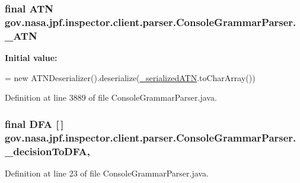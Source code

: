 \subsubsection[{\texorpdfstring{\+\_\+\+A\+TN}{_ATN}}]{\setlength{\rightskip}{0pt plus 5cm}final A\+TN gov.\+nasa.\+jpf.\+inspector.\+client.\+parser.\+Console\+Grammar\+Parser.\+\_\+\+A\+TN\hspace{0.3cm}{\ttfamily [static]}}\hypertarget{classgov_1_1nasa_1_1jpf_1_1inspector_1_1client_1_1parser_1_1_console_grammar_parser_a46eeaa0d1f85061ae721d15d137c2336}{}\label{classgov_1_1nasa_1_1jpf_1_1inspector_1_1client_1_1parser_1_1_console_grammar_parser_a46eeaa0d1f85061ae721d15d137c2336}
{\bfseries Initial value\+:}
\begin{DoxyCode}
=
    \textcolor{keyword}{new} ATNDeserializer().deserialize(\hyperlink{classgov_1_1nasa_1_1jpf_1_1inspector_1_1client_1_1parser_1_1_console_grammar_parser_a2ce69e50a570df550617bcd512552f98}{\_serializedATN}.toCharArray())
\end{DoxyCode}


Definition at line 3889 of file Console\+Grammar\+Parser.\+java.

\subsubsection[{\texorpdfstring{\+\_\+decision\+To\+D\+FA}{_decisionToDFA}}]{\setlength{\rightskip}{0pt plus 5cm}final D\+FA \mbox{[}$\,$\mbox{]} gov.\+nasa.\+jpf.\+inspector.\+client.\+parser.\+Console\+Grammar\+Parser.\+\_\+decision\+To\+D\+FA\hspace{0.3cm}{\ttfamily [static]}, {\ttfamily [protected]}}\hypertarget{classgov_1_1nasa_1_1jpf_1_1inspector_1_1client_1_1parser_1_1_console_grammar_parser_acb7ae2e132c4bbd7a73cd47b24364a40}{}\label{classgov_1_1nasa_1_1jpf_1_1inspector_1_1client_1_1parser_1_1_console_grammar_parser_acb7ae2e132c4bbd7a73cd47b24364a40}


Definition at line 23 of file Console\+Grammar\+Parser.\+java.

